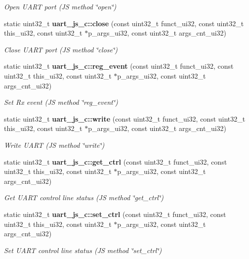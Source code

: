 \begin{DoxyCompactItemize}
\begin{DoxyCompactList}\small\item\em Open U\+A\+RT port (JS method \char`\"{}open\char`\"{}) \end{DoxyCompactList}\item 
static uint32\+\_\+t \textbf{ uart\+\_\+js\+\_\+c\+::close} (const uint32\+\_\+t funct\+\_\+ui32, const uint32\+\_\+t this\+\_\+ui32, const uint32\+\_\+t $\ast$p\+\_\+args\+\_\+ui32, const uint32\+\_\+t args\+\_\+cnt\+\_\+ui32)
\begin{DoxyCompactList}\small\item\em Close U\+A\+RT port (JS method \char`\"{}close\char`\"{}) \end{DoxyCompactList}\item 
static uint32\+\_\+t \textbf{ uart\+\_\+js\+\_\+c\+::reg\+\_\+event} (const uint32\+\_\+t funct\+\_\+ui32, const uint32\+\_\+t this\+\_\+ui32, const uint32\+\_\+t $\ast$p\+\_\+args\+\_\+ui32, const uint32\+\_\+t args\+\_\+cnt\+\_\+ui32)
\begin{DoxyCompactList}\small\item\em Set Rx event (JS method \char`\"{}reg\+\_\+event\char`\"{}) \end{DoxyCompactList}\item 
static uint32\+\_\+t \textbf{ uart\+\_\+js\+\_\+c\+::write} (const uint32\+\_\+t funct\+\_\+ui32, const uint32\+\_\+t this\+\_\+ui32, const uint32\+\_\+t $\ast$p\+\_\+args\+\_\+ui32, const uint32\+\_\+t args\+\_\+cnt\+\_\+ui32)
\begin{DoxyCompactList}\small\item\em Write U\+A\+RT (JS method \char`\"{}write\char`\"{}) \end{DoxyCompactList}\item 
static uint32\+\_\+t \textbf{ uart\+\_\+js\+\_\+c\+::get\+\_\+ctrl} (const uint32\+\_\+t funct\+\_\+ui32, const uint32\+\_\+t this\+\_\+ui32, const uint32\+\_\+t $\ast$p\+\_\+args\+\_\+ui32, const uint32\+\_\+t args\+\_\+cnt\+\_\+ui32)
\begin{DoxyCompactList}\small\item\em Get U\+A\+RT control line status (JS method \char`\"{}get\+\_\+ctrl\char`\"{}) \end{DoxyCompactList}\item 
static uint32\+\_\+t \textbf{ uart\+\_\+js\+\_\+c\+::set\+\_\+ctrl} (const uint32\+\_\+t funct\+\_\+ui32, const uint32\+\_\+t this\+\_\+ui32, const uint32\+\_\+t $\ast$p\+\_\+args\+\_\+ui32, const uint32\+\_\+t args\+\_\+cnt\+\_\+ui32)
\begin{DoxyCompactList}\small\item\em Set U\+A\+RT control line status (JS method \char`\"{}set\+\_\+ctrl\char`\"{}) \end{DoxyCompactList}\end{DoxyCompactItemize}


